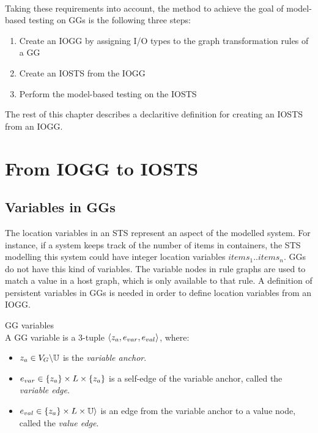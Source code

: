 \paragraph*{} Taking these requirements into account, the method to achieve the goal of model-based testing on GGs is the following three steps:
\begin{enumerate}
\item Create an IOGG by assigning I/O types to the graph transformation rules of a GG
\item Create an IOSTS from the IOGG
\item Perform the model-based testing on the IOSTS
\end{enumerate}
The rest of this chapter describes a declaritive definition for creating an IOSTS from an IOGG.

\section{From IOGG to IOSTS}\label{sec:algorithm}
\subsection{Variables in GGs} 
The location variables in an STS represent an aspect of the modelled system. For instance, if a system keeps track of the number of items in containers, the STS modelling this system could have integer location variables $\mathit{items}_1..\mathit{items}_n$. GGs do not have this kind of variables. The variable nodes in rule graphs are used to match a value in a host graph, which is only available to that rule. A definition of persistent variables in GGs is needed in order to define location variables from an IOGG.

\vspace{10px}
\begin{definition} GG variables \\
A GG variable is a 3-tuple $\langle z_a, e_{var}, e_{val}\rangle$, where:
\begin{itemize}
\item {}$z_a \in V_{G}\backslash\mathbb{U}$ is the \textit{variable anchor}.
\item {}$e_{var} \in \{z_a\} \times L \times \{z_a\}$ is a self-edge of the variable anchor, called the \textit{variable edge}.
\item {}$e_{val} \in \{z_a\} \times L \times \mathbb{U}\rangle$ is an edge from the variable anchor to a value node, called the \textit{value edge}.
\end{itemize}
\end{definition}
\vspace{10px}

